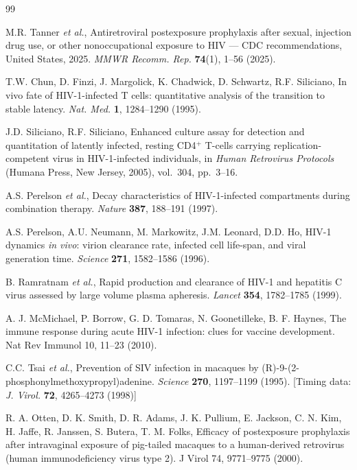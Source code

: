 \documentclass[11pt]{article}
\theoremstyle{definition}
\theoremstyle{remark}
\begin{document}
\begin{thebibliography}{99}

M.R. Tanner \textit{et al.}, Antiretroviral postexposure prophylaxis after sexual, injection drug use, or other nonoccupational exposure to HIV --- CDC recommendations, United States, 2025. \textit{MMWR Recomm. Rep.} \textbf{74}(1), 1--56 (2025). 

T.W. Chun, D. Finzi, J. Margolick, K. Chadwick, D. Schwartz, R.F. Siliciano, In vivo fate of HIV-1-infected T cells: quantitative analysis of the transition to stable latency. \textit{Nat. Med.} \textbf{1}, 1284--1290 (1995).

J.D. Siliciano, R.F. Siliciano, Enhanced culture assay for detection and quantitation of latently infected, resting CD4$^{+}$ T-cells carrying replication-competent virus in HIV-1-infected individuals, in \textit{Human Retrovirus Protocols} (Humana Press, New Jersey, 2005), vol.~304, pp.~3--16. 

A.S. Perelson \textit{et al.}, Decay characteristics of HIV-1-infected compartments during combination therapy. \textit{Nature} \textbf{387}, 188--191 (1997). 

A.S. Perelson, A.U. Neumann, M. Markowitz, J.M. Leonard, D.D. Ho, HIV-1 dynamics \textit{in vivo}: virion clearance rate, infected cell life-span, and viral generation time. \textit{Science} \textbf{271}, 1582--1586 (1996). 

B. Ramratnam \textit{et al.}, Rapid production and clearance of HIV-1 and hepatitis C virus assessed by large volume plasma apheresis. \textit{Lancet} \textbf{354}, 1782--1785 (1999). 

A. J. McMichael, P. Borrow, G. D. Tomaras, N. Goonetilleke, B. F. Haynes, The immune response during acute HIV-1 infection: clues for vaccine development. Nat Rev Immunol 10, 11–23 (2010).

C.C. Tsai \textit{et al.}, Prevention of SIV infection in macaques by (R)-9-(2-phosphonylmethoxypropyl)adenine. \textit{Science} \textbf{270}, 1197--1199 (1995). [Timing data: \textit{J. Virol.} \textbf{72}, 4265--4273 (1998)]

R. A. Otten, D. K. Smith, D. R. Adams, J. K. Pullium, E. Jackson, C. N. Kim, H. Jaffe, R. Janssen, S. Butera, T. M. Folks, Efficacy of postexposure prophylaxis after intravaginal exposure of pig-tailed macaques to a human-derived retrovirus (human immunodeficiency virus type 2). J Virol 74, 9771–9775 (2000).


\end{thebibliography}
\end{document}

